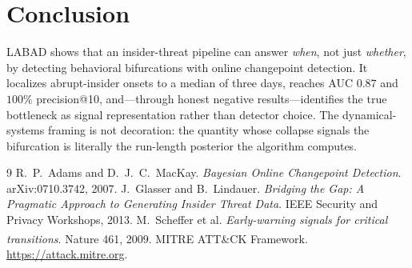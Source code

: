 \documentclass[11pt]{article}
\begin{document}
\section{Conclusion}

LABAD shows that an insider-threat pipeline can answer \emph{when}, not
just \emph{whether}, by detecting behavioral bifurcations with online
changepoint detection. It localizes abrupt-insider onsets to a median of
three days, reaches AUC $0.87$ and $100\%$ precision@10, and---through
honest negative results---identifies the true bottleneck as signal
representation rather than detector choice. The dynamical-systems framing
is not decoration: the quantity whose collapse signals the bifurcation is
literally the run-length posterior the algorithm computes.

\begin{thebibliography}{9}
 R.~P.~Adams and D.~J.~C.~MacKay.
  \emph{Bayesian Online Changepoint Detection}. arXiv:0710.3742, 2007.
 J.~Glasser and B.~Lindauer.
  \emph{Bridging the Gap: A Pragmatic Approach to Generating Insider Threat Data}.
  IEEE Security and Privacy Workshops, 2013.
 M.~Scheffer et al.
  \emph{Early-warning signals for critical transitions}. Nature 461, 2009.
 MITRE ATT\&CK\textsuperscript{\textregistered} Framework.
  \url{https://attack.mitre.org}.
\end{thebibliography}
\end{document}
